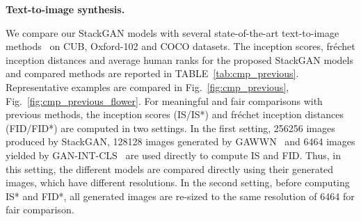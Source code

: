 \documentclass[10pt,journal,letterpaper,compsoc]{IEEEtran}
\begin{document}
\textbf{Text-to-image synthesis.}
{
We compare our StackGAN models with several state-of-the-art text-to-image methods~\cite{reed2016learning, reed2016generative} on CUB, Oxford-102 and COCO datasets. The inception scores, fr\'echet inception distances and average human ranks for the proposed StackGAN models and compared methods are reported in TABLE~\ref{tab:cmp_previous}. Representative examples are compared in Fig.~\ref{fig:cmp_previous}, Fig.~\ref{fig:cmp_previous_flower}. For meaningful and fair comparisons with previous methods, the inception scores (IS/IS*) and fr\'echet inception distances (FID/FID*) are computed in two settings. In the first setting, 256256 images produced by StackGAN, 128128 images generated by GAWWN~\cite{reed2016learning} and 6464 images yielded by GAN-INT-CLS~\cite{reed2016generative} are used directly to compute IS and FID. Thus, in this setting, the different models are compared directly using their generated images, which have different resolutions. In the second setting, before computing IS* and FID*, all generated images are re-sized to the same resolution of 6464 for fair comparison. 


}
\end{document}
